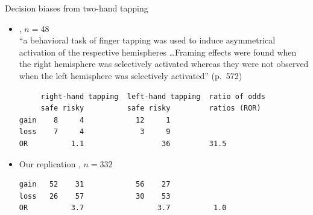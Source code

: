 \documentclass[aspectratio=169]{beamer}
\begin{document}


\begin{frame}[fragile]{Decision biases from two-hand tapping}

\begin{itemize}
\item \citet{McElroySeta04}, $n = 48$\\[1ex]

``a behavioral task of finger tapping was used to induce asymmetrical
activation of the respective hemispheres \dots Framing effects were found when
the right hemisphere was selectively activated whereas they were not observed
when the left hemisphere was selectively activated'' (p.~572)

\begin{lstlisting}
     right-hand tapping  left-hand tapping  ratio of odds
     safe risky          safe risky         ratios (ROR)
gain    8     4            12     1
loss    7     4             3     9
OR          1.1                  36         31.5
\end{lstlisting}

\item Our replication \citep[see][]{Gelman20}, $n = 332$
\begin{lstlisting}
gain   52    31            56    27
loss   26    57            30    53
OR          3.7                 3.7          1.0
\end{lstlisting}
\end{itemize}

\end{frame}


\end{document}
